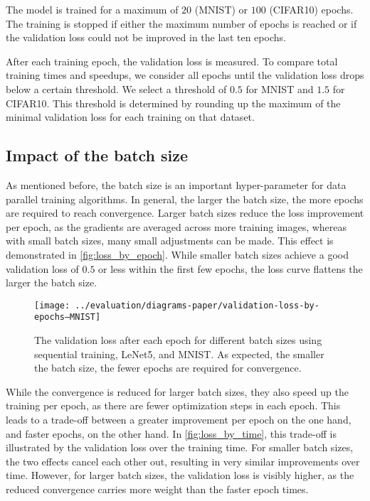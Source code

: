 \documentclass[conference]{IEEEtran}
\begin{document}
The model is trained for a maximum of $20$ (MNIST) or $100$ (CIFAR10) epochs.
The training is stopped if either the maximum number of epochs is reached or if the validation loss could not be improved in the last ten epochs.

After each training epoch, the validation loss is measured.
To compare total training times and speedups, we consider all epochs until the validation loss drops below a certain threshold.
We select a threshold of $0.5$ for MNIST and $1.5$ for CIFAR10.
This threshold is determined by rounding up the maximum of the minimal validation loss for each training on that dataset.


\subsection{Impact of the batch size} %
\label{sub:impact_of_the_batch_size}
As mentioned before, the batch size is an important hyper-parameter for data parallel training algorithms.
In general, the larger the batch size, the more epochs are required to reach convergence.
Larger batch sizes reduce the loss improvement per epoch, as the gradients are averaged across more training images, whereas with small batch sizes, many small adjustments can be made.
%
This effect is demonstrated in \autoref{fig:loss_by_epoch}.
While smaller batch sizes achieve a good validation loss of $0.5$ or less within the first few epochs, the loss curve flattens the larger the batch size.

\begin{figure}[ht]
\centering
\texttt{[image: ../evaluation/diagrams-paper/validation-loss-by-epochs--MNIST]}
\caption{The validation loss after each epoch for different batch sizes using sequential training, LeNet5, and MNIST.
As expected, the smaller the batch size, the fewer epochs are required for convergence.}
\label{fig:loss_by_epoch}
\end{figure}

While the convergence is reduced for larger batch sizes, they also speed up the training per epoch, as there are fewer optimization steps in each epoch.
This leads to a trade-off between a greater improvement per epoch on the one hand, and faster epochs, on the other hand.
In \autoref{fig:loss_by_time}, this trade-off is illustrated by the validation loss over the training time.
For smaller batch sizes, the two effects cancel each other out, resulting in very similar improvements over time.
However, for larger batch sizes, the validation loss is visibly higher, as the reduced convergence carries more weight than the faster epoch times.
\end{document}
